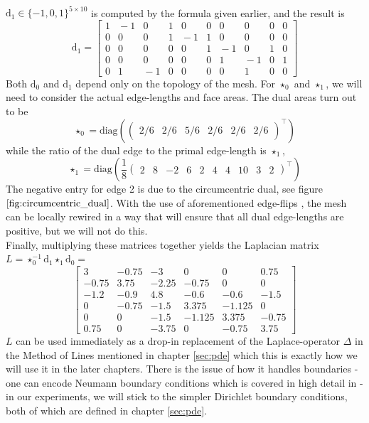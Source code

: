 \\ $\text{d}_1 \in \{-1, 0, 1\}^{5 \times 10}$ is computed by the formula given earlier, and the result is
$$\text{d}_1 = \left[\begin{array}{rrrrrrrrrr}
1 & \!\!\!-1 &  0 &  1 &  0 &  0 &  0 &  0 &  0 &  0
\\ 0 &  0 &  0 &  1 & \!\!\!-1 &  1 &  0 &  0 &  0 &  0
\\ 0 &  0 &  0 &  0 &  0 &  1 & \!\!\!-1 &  0 &  1 &  0
\\ 0 &  0 &  0 &  0 &  0 &  0 &  1 & \!\!\!-1 &  0 &  1
\\ 0 &  1 & \!\!\!-1 &  0 &  0 &  0 &  0 &  1 &  0 &  0
\end{array}\right]$$
Both $\text{d}_0$ and $\text{d}_1$ depend only on the topology of the mesh. For $\star_0$ and $\star_1$, we will need to consider the actual edge-lengths and face areas.
The dual areas turn out to be 
$$\star_0 = \text{diag} (\begin{pmatrix}
    2/6 & 2/6 & 5/6 & 2/6 & 2/6 & 2/6 \end{pmatrix}^\top)$$
while the ratio of the dual edge to the primal edge-length is $\star_1$,
$$\star_1 = \text{diag} (\frac{1}{8}\begin{pmatrix}
   2 & 8 & -2 & 6 & 2 & 4 & 4 & 10 & 3 & 2 \end{pmatrix}^\top)$$
The negative entry for edge 2 is due to the circumcentric dual, see figure $\ref{fig:circumcentric_dual}$. With the use of aforementioned edge-flips \cite{sharp2021intrinsic}, the mesh can be locally rewired in a way that will ensure that all dual edge-lengths are positive, but we will not do this.
\\
Finally, multiplying these matrices together yields the Laplacian matrix $L = \star_0^{-1} \text{d}_1\star_1\text{d}_0 = $
$$\left[\!\!\begin{array}{rrrrrr}
     3   & -0.75 & -3   &  0  &  0  &  0.75 
    \\-0.75 &  3.75 & -2.25 & -0.75 &  0  &  0  
    \\-1.2  & -0.9  &  4.8  & -0.6  & -0.6  & -1.5  
    \\ 0  & -0.75 & -1.5  &  3.375& -1.125&  0  
    \\ 0  &  0  & -1.5  & -1.125&  3.375& -0.75 
    \\ 0.75 &  0  & -3.75 &  0  & -0.75 &  3.75 
\end{array}\!\!\right]$$
$L$ can be used immediately as a drop-in replacement of the Laplace-operator $\Delta$ in the Method of Lines mentioned in chapter \ref{sec:pde} which this is exactly how we will use it in the later chapters. There is the issue of how it handles boundaries - one can encode Neumann boundary conditions which is covered in high detail in \cite{craneDDG} - in our experiments, we will stick to the simpler Dirichlet boundary conditions, both of which are defined in chapter \ref{sec:pde}.
\ifdefined\COMPILINGFROMMAIN
\else    
    
\fi
